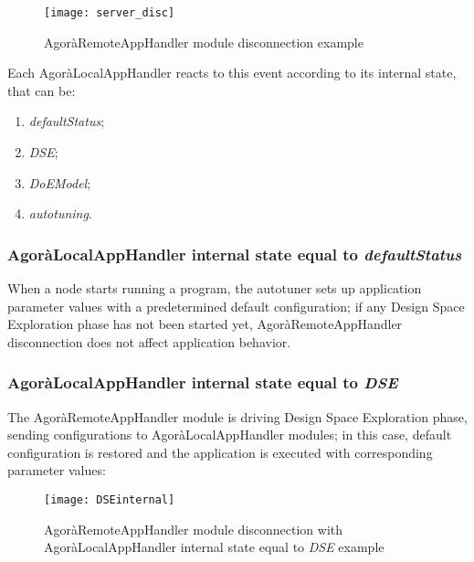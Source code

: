 \begin{figure}[H]

    \centering
    \texttt{[image: server\_disc]}
    \caption{AgoràRemoteAppHandler module disconnection example}
    
\end{figure}

Each AgoràLocalAppHandler reacts to this event according to its internal state, that can be:

\begin{enumerate}

    \item \textit{defaultStatus};
    
    \item \textit{DSE};
    
    \item \textit{DoEModel};
    
    \item \textit{autotuning}.

\end{enumerate}


\subsubsection{AgoràLocalAppHandler internal state equal to \textit{defaultStatus}}

When a node starts running a program, the autotuner sets up application parameter values with a predetermined default configuration; if any Design Space Exploration phase has not been started yet, AgoràRemoteAppHandler disconnection does not affect application behavior.


\subsubsection{AgoràLocalAppHandler internal state equal to \textit{DSE}}

The AgoràRemoteAppHandler module is driving Design Space Exploration phase, sending configurations to AgoràLocalAppHandler modules; in this case, default configuration is restored and the application is executed with corresponding parameter values:

\begin{figure}[H]

    \centering
    \texttt{[image: DSEinternal]}
    \caption{AgoràRemoteAppHandler module disconnection with A\-go\-rà\-Local\-App\-Handler internal state equal to \textit{DSE} example}
    
\end{figure}


